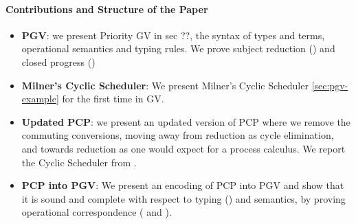 \documentclass[main.tex]{subfiles}
\begin{document}
\paragraph*{Contributions and Structure of the Paper}
\begin{itemize}
\item \textbf{PGV}: we present Priority GV in sec ??, the syntax of types and terms, operational semantics and typing rules. We prove subject reduction () and closed progress ()
\item \textbf{Milner's Cyclic Scheduler}: We present Milner's Cyclic Scheduler \cite{milner89} \cref{sec:pgv-example} for the first time in GV.
\item \textbf{Updated PCP}: we present an updated version of PCP \cite{dardhagay18} where we remove the commuting conversions, moving away from reduction as cycle elimination, and towards reduction as one would expect for a process calculus. We report the Cyclic Scheduler from \cite{dardhagay18}.
\item \textbf{PCP into PGV}: We present an encoding of PCP into PGV and show that it is sound and complete with respect to typing () and semantics, by proving operational correspondence ( and ).
\end{itemize}
\end{document}
